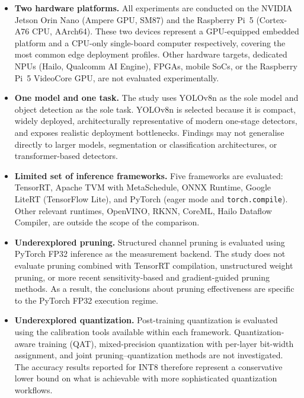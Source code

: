 \documentclass[12pt,a4paper]{report}
\begin{document}
\begin{itemize}

\item \textbf{Two hardware platforms.}
All experiments are conducted on the NVIDIA Jetson Orin Nano (Ampere GPU, SM87) and the Raspberry Pi~5 (Cortex-A76 CPU, AArch64).
These two devices represent a GPU-equipped embedded platform and a CPU-only single-board computer respectively, covering
the most common edge deployment profiles.
Other hardware targets, dedicated NPUs (Hailo, Qualcomm AI Engine), FPGAs, mobile SoCs, or the Raspberry Pi~5 VideoCore
GPU, are not evaluated experimentally.

\item \textbf{One model and one task.}
The study uses YOLOv8n as the sole model and object detection as the sole task.
YOLOv8n is selected because it is compact, widely deployed, architecturally representative of modern one-stage
detectors, and exposes realistic deployment bottlenecks.
Findings may not generalise directly to larger models, segmentation or classification architectures, or transformer-based detectors.

\item \textbf{Limited set of inference frameworks.}
Five frameworks are evaluated: TensorRT, Apache TVM with MetaSchedule, ONNX Runtime, Google LiteRT (TensorFlow Lite),
and PyTorch (eager mode and \texttt{torch.compile}).
Other relevant runtimes, OpenVINO, RKNN, CoreML, Hailo Dataflow Compiler, are outside the scope of the comparison.

\item \textbf{Underexplored pruning.}
Structured channel pruning is evaluated using PyTorch FP32 inference as the measurement backend.
The study does not evaluate pruning combined with TensorRT compilation, unstructured weight pruning, or more recent
sensitivity-based and gradient-guided pruning methods.
As a result, the conclusions about pruning effectiveness are specific to the PyTorch FP32 execution regime.

\item \textbf{Underexplored quantization.}
Post-training quantization is evaluated using the calibration tools available within each framework.
Quantization-aware training (QAT), mixed-precision quantization with per-layer bit-width assignment, and joint
pruning--quantization methods are not investigated.
The accuracy results reported for INT8 therefore represent a conservative lower bound on what is achievable with more
sophisticated quantization workflows.


\end{itemize}
\end{document}
